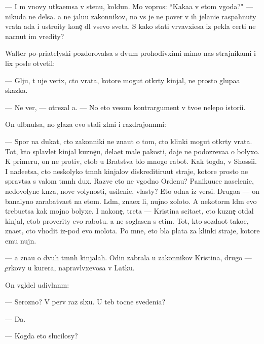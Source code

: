 \documentclass[10pt]{book}
\begin{document}
— I m{\yi} vnovy ut{\yi}ka{\y}emsa v stenu, koldun. Mo{\y} vopros: ``Kaka{\y}a v etom v{\yi}goda?" — nikuda ne delsa. {\Y}a ne jalu{\y}u zakonnikov, no vs{\e} je ne pover{\iu} v ih jelani{\y}e raspahnuty vrata ada i ustro{\y}ity kone{\c} dl{\ia} vsevo sveta. S kako{\y} stati v{\yi}rvavxi{\y}esa iz pekla certi ne nacnut im vredity?

Walter po-pri{\y}atelyski pozdorovalsa s dvum{\ia} prohodivximi mimo nas strajnikami i lix posle otvetil:

— Gl{\ia}ju, t{\yi} uje verix, cto vrata, kotor{\yi}{\y}e mogut otkr{\yi}ty kinjal{\yi}, ne prosto glupa{\y}a skazka.

— Ne ver{\iu}, — otrezal {\y}a. — No eto vesom{\yi}{\y} kontrargument v tvo{\y}e{\y} nelepo{\y} istori{\y}i.

On ul{\yi}bnulsa, no glaza {\y}evo stali zl{\yi}mi i razdrajonn{\yi}mi:

— Spor{\iu} na dukat, cto zakonniki ne zna{\y}ut o tom, cto klinki mogut otkr{\yi}ty vrata. Tot, kto splavl{\ia}{\y}et kinjal{\yi} kuzne{\c}u, dela{\y}et mal{\yi}{\y}e pakosti, daje ne podozreva{\y}a o bolyxo{\y}. K primeru, on ne protiv, ctob{\yi} u Bratstva b{\yi}lo mnogo rabot{\yi}. Kak togda, v Shossi{\y}i. I nade{\y}etsa, cto neskolyko t{\e}mn{\yi}h kinjalov diskreditiru{\y}ut straje{\y}, kotor{\yi}{\y}e prosto ne sprav{\ia}tsa s valom t{\e}mn{\yi}h dux. Razve eto ne v{\yi}godno Ordenu? Paniku{\y}u{\x}e{\y}e naseleni{\y}e, nedovolyn{\yi}{\y}e kn{\ia}z{\y}a, nov{\yi}{\y}e volynosti, usileni{\y}e, vlasty? Eto odna iz versi{\y}. Druga{\y}a — on banalyno zarabat{\yi}va{\y}et na etom. L{\iu}d{\ia}m, zna{\y}ex li, nujno zoloto. A nekotor{\yi}m l{\iu}d{\ia}m {\y}evo trebu{\y}etsa kak mojno bolyxe. I nakone{\c}, tret{\y}a — Kristina scita{\y}et, cto kuzne{\c} otdal kinjal, ctob{\yi} proverity {\y}evo rabotu. {\Y}a ne soglasen s etim. Tot, kto sozda{\y}ot tako{\y}e, zna{\y}et, cto v{\yi}hodit iz-pod {\y}evo molota. Po mne, eto b{\yi}la plata za klinki straje{\y}, kotor{\yi}{\y}e {\y}emu nujn{\yi}.

— {\Y}a zna{\y}u o dvuh t{\e}mn{\yi}h kinjalah. Odin zabrala u zakonnikov Kristina, drugo{\y} — {\c}erkovy u kur{\y}era, napravl{\ia}vxevosa v Latku.

On v{\yi}gl{\ia}del udivl{\e}nn{\yi}m:

— Ser{\y}ozno? V perv{\yi}{\y} raz sl{\yi}xu. U teb{\ia} tocn{\yi}{\y}e svedeni{\y}a?

— Da.

— Kogda eto slucilosy?
\end{document}

